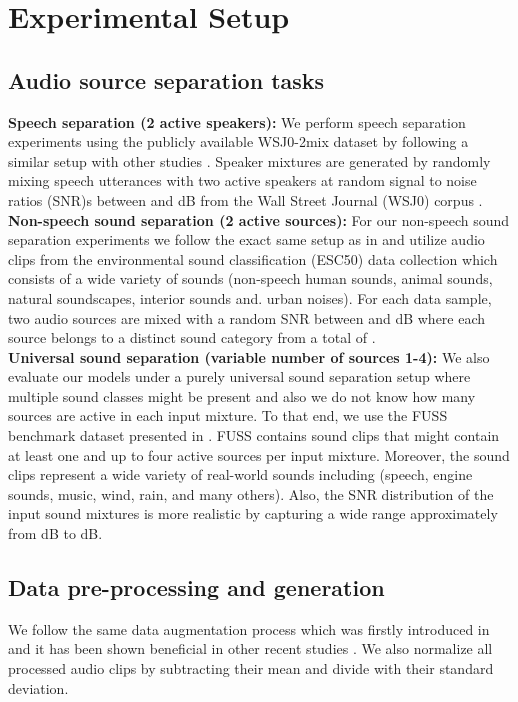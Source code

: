 \section{Experimental Setup}
\label{sec:exp_setup}
\subsection{Audio source separation tasks}
\label{sec:exp_setup:datasets}
\noindent\textbf{Speech separation (2 active speakers):} We perform speech separation experiments using the publicly available WSJ0-2mix dataset \cite{hershey2016deepclustering} by following a similar setup with other studies \cite{luo2019dual,zeghidour2020wavesplit,liu2019DeepCASA}. Speaker mixtures are generated by randomly mixing speech utterances with two active speakers at random signal to noise ratios (SNR)s between  and dB from the Wall Street Journal (WSJ0) corpus \cite{WSJ0}. \\

\noindent\textbf{Non-speech sound separation (2 active sources):} For our non-speech sound separation experiments we follow the exact same setup as in \cite{tzinis2019two} and utilize audio clips from the environmental sound classification (ESC50) data collection \cite{esc50} which consists of a wide variety of sounds (non-speech human sounds, animal sounds, natural soundscapes, interior sounds and. urban noises). For each data sample, two audio sources are mixed with a random SNR between  and dB where each source belongs to a distinct sound category from a total of . \\

\noindent\textbf{Universal sound separation (variable number of sources 1-4):} We also evaluate our models under a purely universal sound separation setup where multiple sound classes might be present and also we do not know how many sources are active in each input mixture. To that end, we use the FUSS benchmark dataset presented in \cite{wisdom2020FUSS}. FUSS contains sound clips that might contain at least one and up to four active sources per input mixture. Moreover, the sound clips represent a wide variety of real-world sounds including (speech, engine sounds, music, wind, rain, and many others). Also, the SNR distribution of the input sound mixtures is more realistic by capturing a wide range approximately from dB to dB.


\subsection{Data pre-processing and generation}
We follow the same data augmentation process which was firstly introduced in \cite{tzinis2019two} and it has been shown beneficial in other recent studies \cite{zeghidour2020wavesplit}. We also normalize all processed audio clips by subtracting their mean and divide with their standard deviation.

